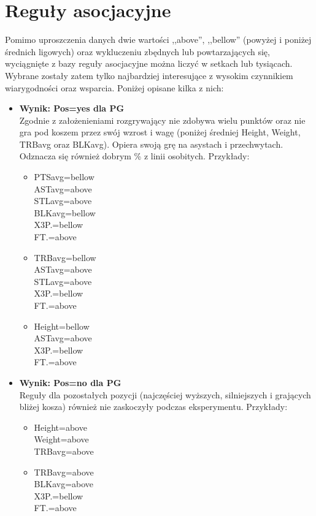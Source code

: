 \documentclass[twoside,twocolumn]{article}
\begin{document}

\section{Reguły asocjacyjne}

\indent Pomimo uproszczenia danych dwie wartości ,,above'', ,,bellow'' (powyżej i poniżej średnich ligowych) oraz wykluczeniu zbędnych lub powtarzających się, wyciągnięte z bazy reguły asocjacyjne można liczyć w setkach lub tysiącach. Wybrane zostały zatem tylko najbardziej interesujące z wysokim czynnikiem wiarygodności oraz wsparcia. Poniżej opisane kilka z nich:

\begin{itemize}
\item \textbf{Wynik: Pos=yes dla PG}\\
Zgodnie z założenieniami rozgrywający nie zdobywa wielu punktów oraz nie gra pod koszem przez swój wzrost i wagę (poniżej średniej Height, Weight, TRBavg oraz BLKavg). Opiera swoją grę na asystach i przechwytach. Odznacza się również dobrym \% z linii osobitych. Przykłady:
\begin{itemize}
	\item PTSavg=bellow \\ ASTavg=above\\ STLavg=above\\ BLKavg=bellow\\ X3P.=bellow \\ FT.=above \\
	\item TRBavg=bellow \\ ASTavg=above \\ STLavg=above \\ X3P.=bellow \\ 
	FT.=above \\
	\item Height=bellow \\ ASTavg=above \\ X3P.=bellow \\ FT.=above
\end{itemize}
\end{itemize}

\begin{itemize}
\item \textbf{Wynik: Pos=no dla PG}\\
Reguły dla pozostałych pozycji (najczęściej wyższych, silniejszych i grających bliżej kosza) również nie zaskoczyły podczas eksperymentu. Przykłady:
\begin{itemize}
	\item Height=above \\ Weight=above \\ TRBavg=above \\
	\item TRBavg=above \\ BLKavg=above \\ X3P.=bellow \\ FT.=above
\end{itemize}
\end{itemize}
\end{document}
